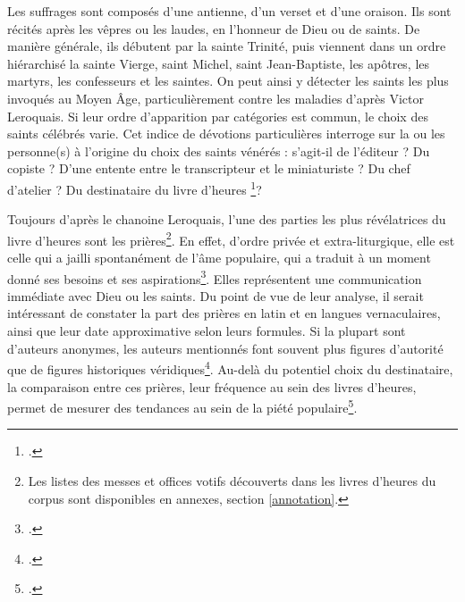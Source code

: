 \documentclass[a4paper,12pt,twoside]{book}
\begin{document}
	Les suffrages sont composés d'une antienne, d'un verset et d'une oraison. Ils sont récités après les vêpres ou les laudes, en l'honneur de Dieu ou de saints. De manière générale, ils débutent par la sainte Trinité, puis viennent dans un ordre hiérarchisé la sainte Vierge, saint Michel, saint Jean-Baptiste, les apôtres, les martyrs, les confesseurs et les saintes. On peut ainsi y détecter les saints les plus invoqués au Moyen Âge, particulièrement contre les maladies d'après Victor Leroquais. Si leur ordre d'apparition par catégories est commun, le choix des saints célébrés varie. Cet indice de dévotions particulières interroge sur la ou les personne(s) à l'origine du choix des saints vénérés : s'agit-il de l'éditeur ? Du copiste ? D'une entente entre le transcripteur et le miniaturiste ? Du chef d'atelier ? Du destinataire du livre d'heures \footcite[p. XXI-XXII]{Leroquais_notices}? 
	
	Toujours d'après le chanoine Leroquais, l'une des parties les plus révélatrices du livre d'heures sont les prières\footnote{Les listes des messes et offices votifs découverts dans les livres d'heures du corpus sont disponibles en annexes, section \ref{annotation}.}. En effet, d'ordre privée et extra-liturgique, elle est \og celle qui a jailli spontanément de l’âme populaire, qui a traduit à un moment donné ses besoins et ses aspirations\fg{}\footcite[p. XXIX]{Leroquais_notices}. Elles représentent une communication immédiate avec Dieu ou les saints. Du point de vue de leur analyse, il serait intéressant de constater la part des prières en latin et en langues vernaculaires, ainsi que leur date approximative selon leurs formules. Si la plupart sont d'auteurs anonymes, les auteurs mentionnés font souvent plus figures d'autorité que de figures historiques véridiques\footcite[p. XXIX]{Leroquais_notices}. Au-delà du potentiel choix du destinataire, la comparaison entre ces prières, leur fréquence au sein des livres d'heures, permet de mesurer des tendances au sein de la piété populaire\footcite[p. XXX]{Leroquais_notices}. 
	
\end{document}
